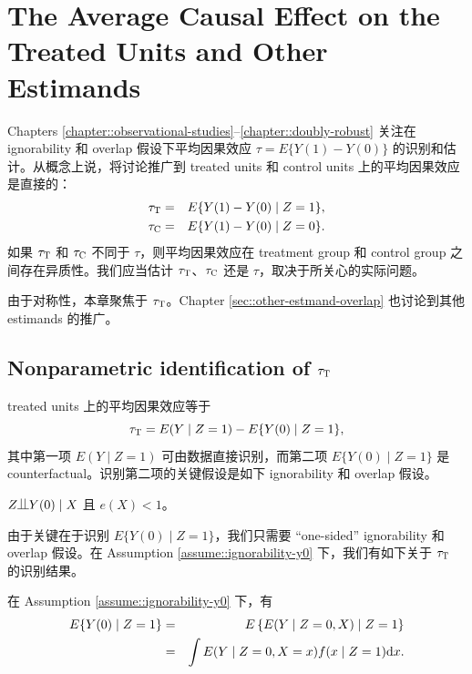 
\chapter{The Average Causal Effect on the Treated Units and Other Estimands}
 \label{chapter::ATT-and-other}

Chapters \ref{chapter::observational-studies}--\ref{chapter::doubly-robust} 关注在 ignorability 和 overlap 假设下平均因果效应 $\tau = E\{  Y(1) - Y(0) \}$ 的识别和估计。从概念上说，将讨论推广到 treated units 和 control units 上的平均因果效应是直接的：
\begin{eqnarray*}
\tau_\textsc{T}  &=&  E\{  Y(1) - Y(0) \mid Z=1 \} ,  \\
\tau_\textsc{C}  &=&  E\{  Y(1) - Y(0) \mid Z=0 \} . 
\end{eqnarray*}
如果 $\tau_\textsc{T}$ 和 $\tau_\textsc{C}$ 不同于 $\tau$，则平均因果效应在 treatment group 和 control group 之间存在异质性。我们应当估计 $\tau_\textsc{T}$、$\tau_\textsc{C}$ 还是 $\tau$，取决于所关心的实际问题。


由于对称性，本章聚焦于 $\tau_\textsc{T} $。Chapter \ref{sec::other-estmand-overlap} 也讨论到其他 estimands 的推广。



\section{Nonparametric identification of $\tau_\textsc{T} $ }


treated units 上的平均因果效应等于
$$
\tau_\textsc{T} = E(Y\mid Z=1) -  E\{    Y(0) \mid Z=1 \},
$$
其中第一项 $E(Y\mid Z=1) $ 可由数据直接识别，而第二项 $E\{    Y(0) \mid Z=1 \}$ 是 counterfactual。识别第二项的关键假设是如下 ignorability 和 overlap 假设。



\begin{assumption}
\label{assume::ignorability-y0}
$Z\ind Y(0) \mid X$ 且 $e(X) < 1$。
\end{assumption}

由于关键在于识别 $E\{    Y(0) \mid Z=1 \}$，我们只需要 ``one-sided'' ignorability 和 overlap 假设。在 Assumption \ref{assume::ignorability-y0} 下，我们有如下关于 $\tau_\textsc{T} $ 的识别结果。


\begin{theorem}
\label{thm::identification-ATT}
在 Assumption \ref{assume::ignorability-y0} 下，有
\begin{eqnarray*}
 E\{    Y(0) \mid Z=1 \}  &=& E\left\{  E(    Y \mid Z=0 , X) \mid  Z=1  \right\} \\
 &=&  \int  E(    Y \mid Z=0 , X=x) f(  x \mid Z=1) \textup{d} x .
\end{eqnarray*}
\end{theorem}


